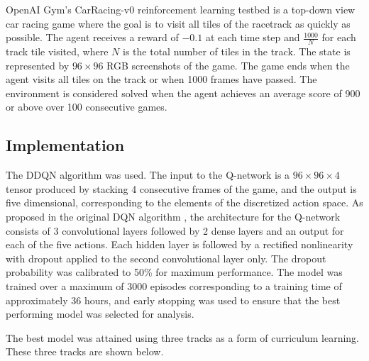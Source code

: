 \documentclass{article}
\begin{document}
OpenAI Gym’s CarRacing-v0 reinforcement learning testbed
\cite{CarRacing} is a top-down view car racing game where the
goal is to visit all tiles of the racetrack as quickly as
possible. The agent receives a reward of $-0.1$ at each time step and
$\frac{1000}{N}$ for each track tile visited, where $N$ is the total
number of tiles in the track. The state is represented by $96\times96$
RGB screenshots of the game. The game ends when the agent visits all
tiles on the track or when 1000 frames have passed. The environment is
considered solved when the agent achieves an average score of 900
or above over 100 consecutive games. 


\subsection{Implementation}
The DDQN algorithm \cite{DDQN} was used. The input
to the Q-network is a $96\times96\times4$ tensor produced by stacking
4 consecutive frames of the game, and the output is five dimensional,
corresponding to the elements of the discretized action space. As
proposed in the original DQN algorithm \cite{DQN}, the architecture
for the Q-network consists of 3 convolutional layers followed by 2
dense layers and an output for each of the five actions. Each hidden
layer is followed by a rectified nonlinearity with dropout applied to
the second convolutional layer only. The dropout probability was calibrated 
to 50\% for maximum performance. The model was trained over a
maximum of 3000 episodes corresponding to a training time of
approximately 36 hours, and early stopping was used to ensure that the
best performing model was selected for analysis.

The best model was attained using three tracks as a form of curriculum
learning. These three tracks are shown below. 
\end{document}
